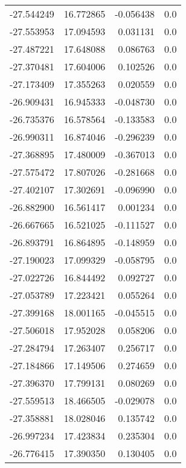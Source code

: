 \begin{tabular}{rrrr}
      -27.544249 &        16.772865 &   -0.056438 &   0.0 \\
      -27.553953 &        17.094593 &    0.031131 &   0.0 \\
      -27.487221 &        17.648088 &    0.086763 &   0.0 \\
      -27.370481 &        17.604006 &    0.102526 &   0.0 \\
      -27.173409 &        17.355263 &    0.020559 &   0.0 \\
      -26.909431 &        16.945333 &   -0.048730 &   0.0 \\
      -26.735376 &        16.578564 &   -0.133583 &   0.0 \\
      -26.990311 &        16.874046 &   -0.296239 &   0.0 \\
      -27.368895 &        17.480009 &   -0.367013 &   0.0 \\
      -27.575472 &        17.807026 &   -0.281668 &   0.0 \\
      -27.402107 &        17.302691 &   -0.096990 &   0.0 \\
      -26.882900 &        16.561417 &    0.001234 &   0.0 \\
      -26.667665 &        16.521025 &   -0.111527 &   0.0 \\
      -26.893791 &        16.864895 &   -0.148959 &   0.0 \\
      -27.190023 &        17.099329 &   -0.058795 &   0.0 \\
      -27.022726 &        16.844492 &    0.092727 &   0.0 \\
      -27.053789 &        17.223421 &    0.055264 &   0.0 \\
      -27.399168 &        18.001165 &   -0.045515 &   0.0 \\
      -27.506018 &        17.952028 &    0.058206 &   0.0 \\
      -27.284794 &        17.263407 &    0.256717 &   0.0 \\
      -27.184866 &        17.149506 &    0.274659 &   0.0 \\
      -27.396370 &        17.799131 &    0.080269 &   0.0 \\
      -27.559513 &        18.466505 &   -0.029078 &   0.0 \\
      -27.358881 &        18.028046 &    0.135742 &   0.0 \\
      -26.997234 &        17.423834 &    0.235304 &   0.0 \\
      -26.776415 &        17.390350 &    0.130405 &   0.0 \\

\end{tabular}
